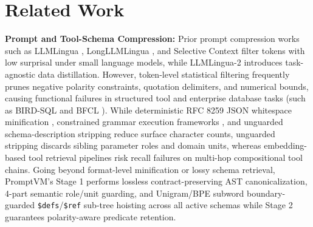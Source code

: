 \documentclass[conference,10pt]{IEEEtran}
\begin{document}
\section{Related Work}
\label{sec:related}
\textbf{Prompt and Tool-Schema Compression:} Prior prompt compression works such as LLMLingua \cite{jiang2023llmlingua}, LongLLMLingua \cite{jiang2024longllmlingua}, and Selective Context \cite{li2023selective} filter tokens with low surprisal under small language models, while LLMLingua-2 \cite{pan2024llmlingua2} introduces task-agnostic data distillation. However, token-level statistical filtering frequently prunes negative polarity constraints, quotation delimiters, and numerical bounds, causing functional failures in structured tool and enterprise database tasks (such as BIRD-SQL \cite{bird2023} and BFCL \cite{patil2024gorilla}). While deterministic RFC 8259 JSON whitespace minification \cite{bray2017rfc8259}, constrained grammar execution frameworks \cite{zheng2024sglang}, and unguarded schema-description stripping reduce surface character counts, unguarded stripping discards sibling parameter roles and domain units, whereas embedding-based tool retrieval pipelines \cite{patil2024gorilla} risk recall failures on multi-hop compositional tool chains. Going beyond format-level minification or lossy schema retrieval, PromptVM's Stage 1 performs lossless contract-preserving AST canonicalization, 4-part semantic role/unit guarding, and Unigram/BPE subword boundary-guarded \texttt{\$defs}/\texttt{\$ref} sub-tree hoisting across all active schemas while Stage 2 guarantees polarity-aware predicate retention.
\end{document}

